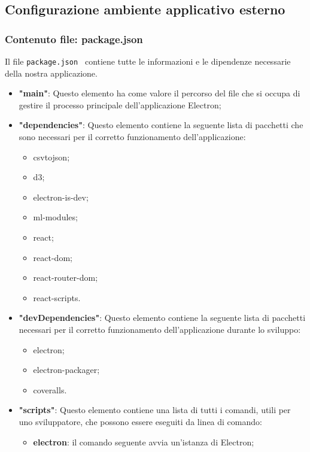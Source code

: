 \subsection{Configurazione ambiente applicativo esterno}
\subsubsection{Contenuto file: package.json}%
Il file \verb|package.json | contiene tutte le informazioni e le dipendenze necessarie della nostra applicazione.
\begin{itemize}
    \item \textbf{"main"}: Questo elemento ha come valore il percorso del file che si occupa di gestire il processo principale dell'applicazione Electron;
    \item \textbf{"dependencies"}: Questo elemento contiene la seguente lista di pacchetti che sono necessari per il corretto funzionamento dell'applicazione:
        \begin{itemize}
            \item csvtojson;
            \item d3;
            \item electron-is-dev;
            \item ml-modules;
            \item react;
            \item react-dom;
            \item react-router-dom;
            \item react-scripts.
        \end{itemize}
    \item \textbf{"devDependencies"}: Questo elemento contiene la seguente lista di pacchetti necessari per il corretto funzionamento dell'applicazione durante lo sviluppo:
        \begin{itemize}
            \item electron;
            \item electron-packager;
            \item coveralls.
        \end{itemize} 
    \item \textbf{"scripts"}: Questo elemento contiene una lista di tutti i comandi, utili per uno sviluppatore, che possono essere eseguiti da linea di comando:
        \begin{itemize}
            \item \textbf{electron}: il comando seguente avvia un'istanza di Electron;

\end{itemize}
\end{itemize}
